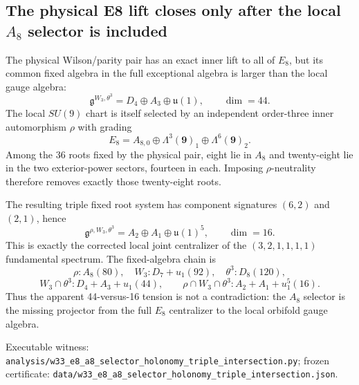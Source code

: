 \subsection{The physical E8 lift closes only after the local $A_8$ selector is included}
\label{sec:20260919-e8-a8-selector-triple}

The physical Wilson/parity pair has an exact inner lift to all of $E_8$, but its common fixed algebra in the full exceptional algebra is larger than the local gauge algebra:
\[
\mathfrak g^{W_3,\theta^3}=D_4\oplus A_3\oplus\mathfrak u(1),\qquad \dim=44.
\]
The local $SU(9)$ chart is itself selected by an independent order-three inner automorphism $\rho$ with grading
\[
E_8=A_{8,0}\oplus\Lambda^3(\mathbf 9)_1\oplus\Lambda^6(\mathbf 9)_2.
\]
Among the 36 roots fixed by the physical pair, eight lie in $A_8$ and twenty-eight lie in the two exterior-power sectors, fourteen in each. Imposing $\rho$-neutrality therefore removes exactly those twenty-eight roots.

The resulting triple fixed root system has component signatures $(6,2)$ and $(2,1)$, hence
\[
\mathfrak g^{\rho,W_3,\theta^3}=A_2\oplus A_1\oplus\mathfrak u(1)^5,
\qquad \dim=16.
\]
This is exactly the corrected local joint centralizer of the $(3,2,1,1,1,1)$ fundamental spectrum. The fixed-algebra chain is
\[
\rho:A_8(80),\quad W_3:D_7{+}u_1(92),\quad \theta^3:D_8(120),
\]
\[
W_3\cap\theta^3:D_4{+}A_3{+}u_1(44),\qquad
\rho\cap W_3\cap\theta^3:A_2{+}A_1{+}u_1^5(16).
\]
Thus the apparent 44-versus-16 tension is not a contradiction: the $A_8$ selector is the missing projector from the full $E_8$ centralizer to the local orbifold gauge algebra.

Executable witness: \texttt{analysis/w33\_e8\_a8\_selector\_holonomy\_triple\_intersection.py}; frozen certificate: \texttt{data/w33\_e8\_a8\_selector\_holonomy\_triple\_intersection.json}.
